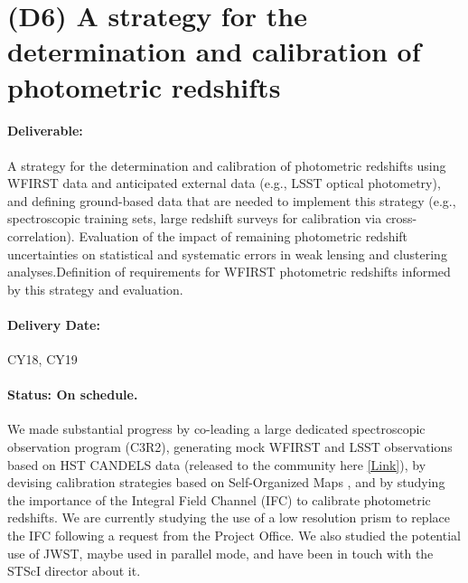 \section*{(D6) A strategy for the determination and calibration of photometric redshifts}

\paragraph*{Deliverable:} A strategy for the determination and calibration of
photometric redshifts using WFIRST data and anticipated external data (e.g.,
LSST optical photometry), and defining ground-based data that are needed to
implement this strategy (e.g., spectroscopic training sets, large redshift
surveys for calibration via cross-correlation). Evaluation of the impact of
remaining photometric redshift uncertainties on statistical and systematic
errors in weak lensing and clustering analyses.Definition of requirements for
WFIRST photometric redshifts informed by this strategy and evaluation.

\paragraph*{Delivery Date:} CY18, CY19

\paragraph*{Status: On schedule.} We made substantial progress by co-leading a large
dedicated spectroscopic observation program (C3R2), generating mock WFIRST and
LSST observations based on HST CANDELS data (released to the community here \href{http://www.wfirst-hls-cosmology.org/products/}{[Link]}), by devising calibration strategies based on Self-Organized Maps \citep{Masters2017,Hemmati:2018}, and by studying the importance of the Integral Field Channel (IFC) to calibrate photometric redshifts. We are currently studying the use of a low resolution prism to replace the IFC following a request from the Project Office. We also studied the potential use of JWST, maybe used in parallel mode, and have been in touch with the STScI director about it. 

